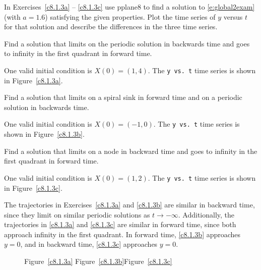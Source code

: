 \documentclass{ximera}
\begin{document}
\noindent In Exercises~\ref{c8.1.3a} -- \ref{c8.1.3c} use {\sf pplane8}
to find a solution to \eqref{e:global2exam} (with $a=1.6$) satisfying the 
given properties. Plot the time series of $y$ versus $t$ for that solution 
and describe the differences in the three time series.
\begin{exercise} \label{c8.1.3a}
Find a solution that limits on the periodic solution in backwards time and 
goes to infinity in the first quadrant in forward time.

\begin{solution}

One valid initial condition is $X(0) = (1,4)$.  The {\tt y vs.\ t}
time series is shown in Figure~\ref{c8.1.3a}.

\end{solution}
\end{exercise}
\begin{exercise} \label{c8.1.3b}
Find a solution that limits on a spiral sink in forward time and on a periodic 
solution in backwards time.

\begin{solution}

One valid initial condition is $X(0) = (-1,0)$.  The {\tt y vs.\ t}
time series is shown in Figure~\ref{c8.1.3b}.


\end{solution}
\end{exercise}
\begin{exercise} \label{c8.1.3c}
Find a solution that limits on a node in backward time and goes to infinity 
in the first quadrant in forward time.

\begin{solution}
One valid initial condition is $X(0) = (1,2)$.  The
{\tt y vs.\ t} time series is shown in Figure~\ref{c8.1.3c}.

\para The trajectories in Exercises~\ref{c8.1.3a} and \ref{c8.1.3b} are
similar in backward time, since they limit on similar periodic
solutions as $t \rightarrow -\infty$.  Additionally, the trajectories
in \ref{c8.1.3a} and \ref{c8.1.3c} are similar in forward time, since
both approach infinity in the first quadrant.  In forward time,
\ref{c8.1.3b} approaches $y = 0$, and in backward time, \ref{c8.1.3c}
approaches $y = 0$.

\begin{figure}[htb]
                       \centerline{%
                       }
		\centerline{Figure~\ref{c8.1.3a}\hspace{1.2in}
Figure~\ref{c8.1.3b}\hspace{1.2in}Figure~\ref{c8.1.3c}}
\end{figure}




\end{solution}
\end{exercise}
\end{document}
